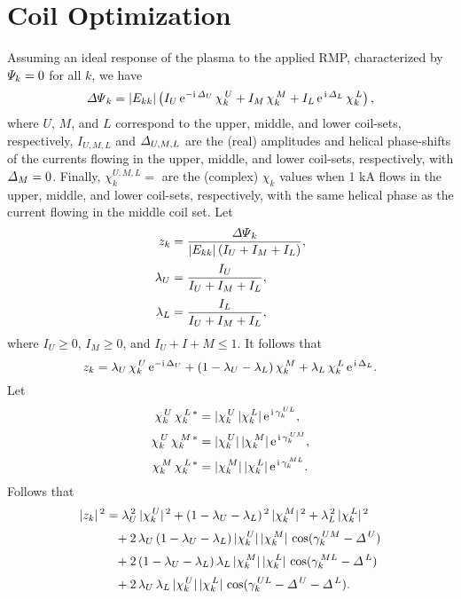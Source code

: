 \documentclass[notitlepage,12pt]{article}
\begin{document}
\section{Coil Optimization}
Assuming an ideal response of the plasma to the applied RMP, characterized by ${\mit\Psi}_k=0$ for all $k$, 
we have
\begin{equation}
{\mit\Delta\Psi}_k = |E_{kk}|\left(
  I_U \, {\rm e}^{-{\rm i}\,{\mit\Delta}_U}\,\chi_k^{\,U}
+I_M\,                                         \chi_k^{\,M}
+I_L \, {\rm e}^{\,{\rm i}\,{\mit\Delta}_L}\,\chi_k^{\,L}
\right),
\end{equation}
where $U$, $M$, and $L$ correspond to the upper, middle, and lower coil-sets, respectively, $I_{U,M,L}$ and ${\mit\Delta}_{U,M,L}$
are the (real) amplitudes and helical phase-shifts of the currents flowing in the upper, middle, and lower coil-sets, respectively, with ${\mit\Delta}_M=0$.  Finally, $\chi_k^{U,M,L}=$ are the (complex) $\chi_k$ values when 1 kA flows in the upper, middle, and lower coil-sets, respectively,
with the same helical phase as the current flowing in the middle coil set.
Let
\begin{align}
z_k& =\frac{ {\mit\Delta\Psi}_k }{ |E_{kk}|\,(I_U+I_M+I_L)},\\[0.5ex]
\lambda_U&=\frac{I_{U}}{I_U+I_{M}+I_L},\\[0.5ex]
\lambda_L&=\frac{I_{L}}{I_U+I_M+I_L},
\end{align}
where $I_U\geq 0$, $I_M\geq 0$, and $I_U+I+M \leq 1$. 
It follows that
\begin{equation}
z_k =\lambda_{U}\,\chi_k^{\,U}\,{\rm e}^{-{\rm i}\,\Delta_U}+(1-\lambda_U-\lambda_L)\,\chi_k^{\,M}+\lambda_{L}\,\chi_k^{\,L}
\,{\rm e}^{\,{\rm i}\,\Delta_L}.
\end{equation}
Let
\begin{align}
\chi_k^{\,U}\,\chi_k^{\,L\,\ast} &= |\chi_k^{\,U}\,|\chi_k^{\,L}|\,{\rm e}^{\,{\rm i}\,\gamma_k^{\,UL}},\\[0.5ex]
\chi_k^{\,U}\,\chi_k^{\,M\,\ast} &= |\chi_k^{\,U}|\,|\chi_k^{\,M}|\,{\rm e}^{\,{\rm i}\,\gamma_k^{\,UM}},\\[0.5ex]
\chi_k^{\,M}\,\chi_k^{\,L\,\ast} &= |\chi_k^{\,M}|\,|\chi_k^{\,L}|\,{\rm e}^{\,{\rm i}\,\gamma_k^{\,ML}}.
\end{align}
Follows that
\begin{align}
|z_k|^{\,2} &= \lambda_U^{\,2}\,|\chi_k^{\,U}|^{\,2}+ (1-\lambda_U-\lambda_L)^{\,2}\,|\chi_k^{\,M}|^{\,2} + \lambda_L^{\,2}\,|\chi_k^{\,L}|^{\,2}\nonumber\\[0.5ex]
&\phantom{=}+2\,\lambda_U\,(1-\lambda_U-\lambda_L)\,|\chi_k^{\,U}|\,|\chi_k^{\,M}|\,\cos(\gamma_k^{\,UM}-{\mit\Delta}^{\,U})\\[0.5ex]
&\phantom{=}+2\,(1-\lambda_U-\lambda_L)\,\lambda_L\,|\chi_k^{\,M}|\,|\chi_k^{\,L}|\,\cos(\gamma_k^{\,ML}-{\mit\Delta}^{\,L})\\[0.5ex]
&\phantom{=}+2\,\lambda_U\,\lambda_L\,|\chi_k^{\,U}|\,|\chi_k^{\,L}|\,\cos(\gamma_k^{\,UL}-{\mit\Delta}^{\,U}-{\mit\Delta}^{\,L}).
\end{align}
\end{document}
